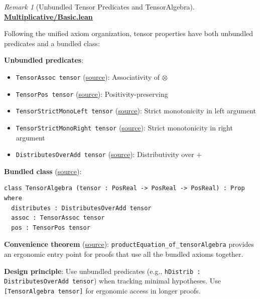 \documentclass[11pt]{article}
\theoremstyle{definition}
\theoremstyle{remark}
\newtheorem{remark}[theorem]{Remark}
\begin{document}
\begin{remark}[Unbundled Tensor Predicates and TensorAlgebra]
\textbf{\href{https://github.com/zariuq/ks-foundations-of-inference/blob/main/KnuthSkilling/Multiplicative/Basic.lean}{Multiplicative/Basic.lean}}

Following the unified axiom organization, tensor properties have both unbundled predicates and a bundled class:

\textbf{Unbundled predicates}:
\begin{itemize}
\item \texttt{TensorAssoc tensor} (\href{https://github.com/zariuq/ks-foundations-of-inference/blob/main/KnuthSkilling/Multiplicative/Basic.lean}{source}): Associativity of $\otimes$
\item \texttt{TensorPos tensor} (\href{https://github.com/zariuq/ks-foundations-of-inference/blob/main/KnuthSkilling/Multiplicative/Basic.lean}{source}): Positivity-preserving
\item \texttt{TensorStrictMonoLeft tensor} (\href{https://github.com/zariuq/ks-foundations-of-inference/blob/main/KnuthSkilling/Multiplicative/Basic.lean}{source}): Strict monotonicity in left argument
\item \texttt{TensorStrictMonoRight tensor} (\href{https://github.com/zariuq/ks-foundations-of-inference/blob/main/KnuthSkilling/Multiplicative/Basic.lean}{source}): Strict monotonicity in right argument
\item \texttt{DistributesOverAdd tensor} (\href{https://github.com/zariuq/ks-foundations-of-inference/blob/main/KnuthSkilling/Multiplicative/Basic.lean}{source}): Distributivity over $+$
\end{itemize}

\textbf{Bundled class} (\href{https://github.com/zariuq/ks-foundations-of-inference/blob/main/KnuthSkilling/Multiplicative/Basic.lean}{source}):
\begin{lstlisting}
class TensorAlgebra (tensor : PosReal -> PosReal -> PosReal) : Prop where
  distributes : DistributesOverAdd tensor
  assoc : TensorAssoc tensor
  pos : TensorPos tensor
\end{lstlisting}

\textbf{Convenience theorem} (\href{https://github.com/zariuq/ks-foundations-of-inference/blob/main/KnuthSkilling/Multiplicative/Basic.lean}{source}): \texttt{productEquation\_of\_tensorAlgebra} provides
an ergonomic entry point for proofs that use all the bundled axioms together.

\textbf{Design principle}: Use unbundled predicates (e.g., \texttt{hDistrib : DistributesOverAdd tensor})
when tracking minimal hypotheses. Use \texttt{[TensorAlgebra tensor]} for ergonomic access in longer proofs.
\end{remark}
\end{document}

